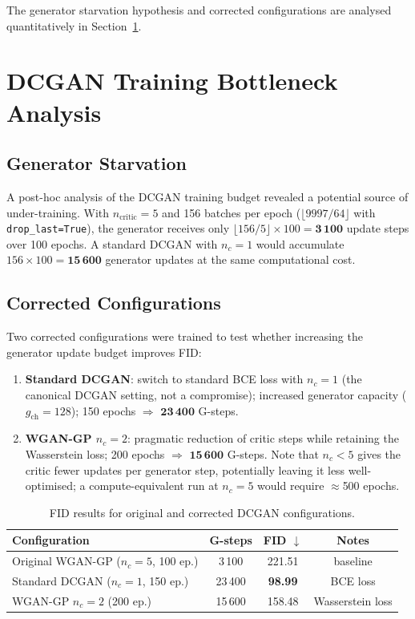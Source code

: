 \documentclass[12pt,a4paper]{article}
\begin{document}
The generator starvation hypothesis and corrected configurations are analysed
quantitatively in Section~\ref{sec:dcgan_bottleneck}.

\section{DCGAN Training Bottleneck Analysis}
\label{sec:dcgan_bottleneck}

\subsection{Generator Starvation}

A post-hoc analysis of the DCGAN training budget revealed a potential source of
under-training.  With $n_{\text{critic}}=5$ and 156 batches per epoch
($\lfloor 9997/64 \rfloor$ with \texttt{drop\_last=True}), the generator
receives only $\lfloor 156/5 \rfloor \times 100 = \mathbf{3\,100}$ update steps
over 100 epochs.  A standard DCGAN with $n_c=1$ would accumulate $156 \times 100
= \mathbf{15\,600}$ generator updates at the same computational cost.

\subsection{Corrected Configurations}

Two corrected configurations were trained to test whether increasing the
generator update budget improves FID:

\begin{enumerate}[noitemsep]
  \item \textbf{Standard DCGAN}: switch to standard BCE loss with $n_c=1$
        (the canonical DCGAN setting, not a compromise); increased generator
        capacity ($g_{\text{ch}}=128$); 150 epochs $\Rightarrow$
        $\mathbf{23\,400}$ G-steps.
  \item \textbf{WGAN-GP $n_c=2$}: pragmatic reduction of critic steps while
        retaining the Wasserstein loss; 200 epochs $\Rightarrow$
        $\mathbf{15\,600}$ G-steps.  Note that $n_c < 5$ gives the critic
        fewer updates per generator step, potentially leaving it less
        well-optimised; a compute-equivalent run at $n_c=5$ would require
        $\approx$500 epochs.
\end{enumerate}

\begin{table}[H]
  \centering
  \caption{FID results for original and corrected DCGAN configurations.}
  \label{tab:dcgan_fixed}
  \begin{tabular}{lccc}
    \toprule
    Configuration & G-steps & FID $\downarrow$ & Notes \\
    \midrule
    Original WGAN-GP ($n_c=5$, 100 ep.) & 3\,100  & 221.51 & baseline \\
    Standard DCGAN ($n_c=1$, 150 ep.)   & 23\,400 & \textbf{98.99}  & BCE loss \\
    WGAN-GP $n_c=2$ (200 ep.)           & 15\,600 & 158.48 & Wasserstein loss \\
    \bottomrule
  \end{tabular}
\end{table}
\end{document}
